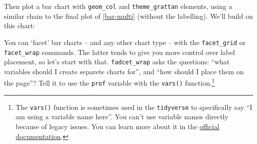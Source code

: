 \documentclass[]{book}
\newenvironment{Shaded}{\begin{snugshade}}{\end{snugshade}}
\newcommand{\DataTypeTok}[1]{\textcolor[rgb]{0.13,0.29,0.53}{#1}}
\newcommand{\DecValTok}[1]{\textcolor[rgb]{0.00,0.00,0.81}{#1}}
\newcommand{\FloatTok}[1]{\textcolor[rgb]{0.00,0.00,0.81}{#1}}
\newcommand{\KeywordTok}[1]{\textcolor[rgb]{0.13,0.29,0.53}{\textbf{#1}}}
\newcommand{\NormalTok}[1]{#1}
\newcommand{\OperatorTok}[1]{\textcolor[rgb]{0.81,0.36,0.00}{\textbf{#1}}}
\newcommand{\OtherTok}[1]{\textcolor[rgb]{0.56,0.35,0.01}{#1}}
\newcommand{\StringTok}[1]{\textcolor[rgb]{0.31,0.60,0.02}{#1}}
\begin{document}
Then plot a bar chart with \texttt{geom\_col} and \texttt{theme\_grattan} elements, using a similar chain to the final plot of \ref{bar-multi} (without the labelling). We'll build on this chart:

\begin{Shaded}
\end{Shaded}

You can `facet' bar charts -- and any other chart type -- with the \texttt{facet\_grid} or \texttt{facet\_wrap} commands. The latter tends to give you more control over label placement, so let's start with that. \texttt{fadcet\_wrap} asks the questions: ``what variables should I create separete charts for'', and ``how should I place them on the page''? Tell it to use the \texttt{prof} variable with the \texttt{vars()} function.\footnote{The \texttt{vars()} function is sometimes used in the \texttt{tidyverse} to specifically say ``I am using a variable name here''. You can't use variable names directly because of legacy issues. You can learn more about it in the \href{https://ggplot2.tidyverse.org/reference/facet_wrap.html}{official documentation}.}
\end{document}
